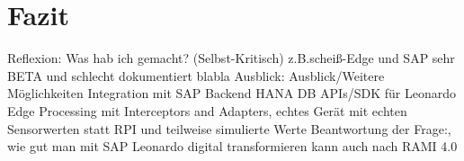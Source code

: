 \section{Fazit}

Reflexion:
Was hab ich gemacht? (Selbst-Kritisch) z.B.scheiß-Edge und SAP sehr BETA und schlecht dokumentiert blabla
\newline
Ausblick:
Ausblick/Weitere Möglichkeiten
Integration mit SAP Backend
HANA DB
APIs/SDK für Leonardo
Edge Processing mit Interceptors and Adapters, echtes Gerät mit echten Sensorwerten statt RPI und teilweise simulierte Werte
\newline
Beantwortung der Frage:, wie gut man mit SAP Leonardo digital transformieren kann auch nach RAMI 4.0

\newpage
